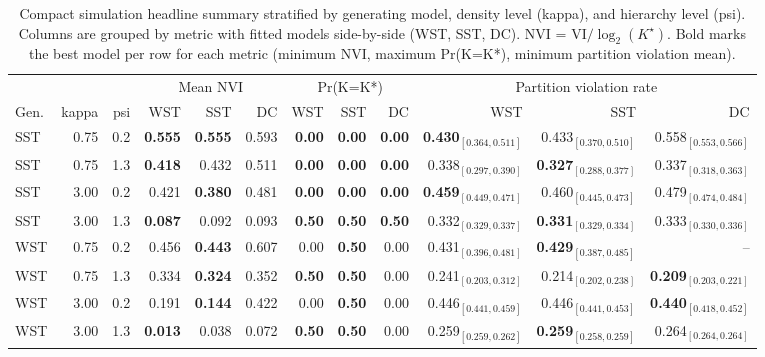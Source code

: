 \begin{table}[!h]
\centering
\caption{Compact simulation headline summary stratified by generating model, density level (kappa), and hierarchy level (psi). Columns are grouped by metric with fitted models side-by-side (WST, SST, DC). NVI = VI$/\log_2(K^\star)$. Bold marks the best model per row for each metric (minimum NVI, maximum Pr(K=K*), minimum partition violation mean).\\\label{tab:sim-headline-compact}}
\centering
\begin{tabular}[t]{lrrrrrrrrrrr}
\toprule
\multicolumn{3}{c}{ } & \multicolumn{3}{c}{Mean NVI} & \multicolumn{3}{c}{Pr(K=K*)} & \multicolumn{3}{c}{Partition violation rate} \\
\cmidrule(l{3pt}r{3pt}){4-6} \cmidrule(l{3pt}r{3pt}){7-9} \cmidrule(l{3pt}r{3pt}){10-12}
Gen. & kappa & psi & WST & SST & DC & WST & SST & DC & WST & SST & DC\\
\midrule
SST & 0.75 & 0.2 & \textbf{0.555} & \textbf{0.555} & 0.593 & \textbf{0.00} & \textbf{0.00} & \textbf{0.00} & \textbf{0.430$_{[0.364,0.511]}$} & 0.433$_{[0.370,0.510]}$ & 0.558$_{[0.553,0.566]}$\\
SST & 0.75 & 1.3 & \textbf{0.418} & 0.432 & 0.511 & \textbf{0.00} & \textbf{0.00} & \textbf{0.00} & 0.338$_{[0.297,0.390]}$ & \textbf{0.327$_{[0.288,0.377]}$} & 0.337$_{[0.318,0.363]}$\\
SST & 3.00 & 0.2 & 0.421 & \textbf{0.380} & 0.481 & \textbf{0.00} & \textbf{0.00} & \textbf{0.00} & \textbf{0.459$_{[0.449,0.471]}$} & 0.460$_{[0.445,0.473]}$ & 0.479$_{[0.474,0.484]}$\\
SST & 3.00 & 1.3 & \textbf{0.087} & 0.092 & 0.093 & \textbf{0.50} & \textbf{0.50} & \textbf{0.50} & 0.332$_{[0.329,0.337]}$ & \textbf{0.331$_{[0.329,0.334]}$} & 0.333$_{[0.330,0.336]}$\\
WST & 0.75 & 0.2 & 0.456 & \textbf{0.443} & 0.607 & 0.00 & \textbf{0.50} & 0.00 & 0.431$_{[0.396,0.481]}$ & \textbf{0.429$_{[0.387,0.485]}$} & --\\
WST & 0.75 & 1.3 & 0.334 & \textbf{0.324} & 0.352 & \textbf{0.50} & \textbf{0.50} & 0.00 & 0.241$_{[0.203,0.312]}$ & 0.214$_{[0.202,0.238]}$ & \textbf{0.209$_{[0.203,0.221]}$}\\
WST & 3.00 & 0.2 & 0.191 & \textbf{0.144} & 0.422 & 0.00 & \textbf{0.50} & 0.00 & 0.446$_{[0.441,0.459]}$ & 0.446$_{[0.441,0.453]}$ & \textbf{0.440$_{[0.418,0.452]}$}\\
WST & 3.00 & 1.3 & \textbf{0.013} & 0.038 & 0.072 & \textbf{0.50} & \textbf{0.50} & 0.00 & 0.259$_{[0.259,0.262]}$ & \textbf{0.259$_{[0.258,0.259]}$} & 0.264$_{[0.264,0.264]}$\\
\bottomrule
\end{tabular}
\end{table}
